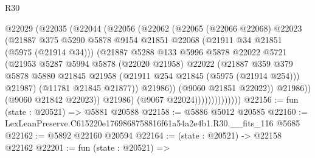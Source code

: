 \begin{lexlean}{R30}
\begin{coremodule}
                            @22029
                              (@22035
                                (@22044
                                  (@22056
                                    (@22062
                                      (@22065
                                        (@22066 @22068)
                                        @22023
                                        (@21887
                                          @375
                                          @5290
                                          @5878
                                          @9154
                                          @21851
                                          @22068
                                          (@21911 @34 @21851 (@5975 (@21914 @34)))
                                          (@21887
                                            @5288
                                            @133
                                            @5996
                                            @5878
                                            @22022
                                            @5721
                                            (@21953
                                              @5287
                                              @5994
                                              @5878
                                              (@22020 @21958)
                                              @22022
                                              (@21887
                                                @359
                                                @379
                                                @5878
                                                @5880
                                                @21845
                                                @21958
                                                (@21911 @254 @21845 (@5975 (@21914 @254)))
                                                @21987)
                                              (@11781 @21845 @21877))
                                            @21986))
                                        (@9060 @21851 @22022))
                                      @21986))
                                  (@9060 @21842 @22023))
                                @21986)
                              (@9067 @22024))))))))))))))
@22156 := fun (state : @20521) => @5881 @20588
@22158 := @5886 @5012 @20585
@22160 := LexLeanPreserve.C615220e1769868758816f61a54a2e4b1.R30.__fits_116 @5685
@22162 := @5892 @22160 @20594
@22164 := (state : @20521) -> @22158 @22162
@22201 := fun (state : @20521) =>

\end{coremodule}
\end{lexlean}
